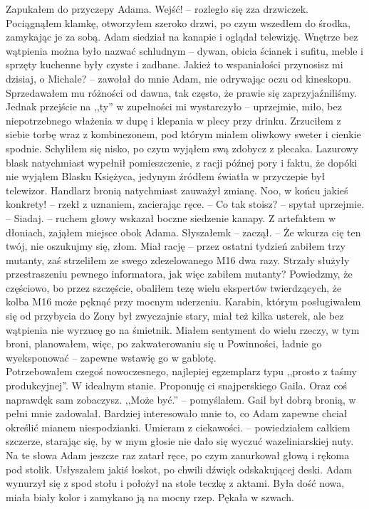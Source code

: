 \documentclass[../MAIN.tex]{subfiles}
\begin{document}
Zapukałem do przyczepy Adama.
\sx Wejść! -- rozległo się zza drzwiczek.
\qd
Pociągnąłem klamkę, otworzyłem szeroko drzwi, po czym wszedłem do środka, zamykając je za sobą. Adam siedział na kanapie i oglądał telewizję. Wnętrze bez wątpienia można było nazwać schludnym -- dywan, obicia ścianek i sufitu, meble i sprzęty kuchenne były czyste i zadbane.
\sx Jakież to wspaniałości przynosisz mi dzisiaj, o Michale? -- zawołał do mnie Adam, nie odrywając oczu od kineskopu. 
\qd
Sprzedawałem mu różności od dawna, tak często, że prawie się zaprzyjaźniliśmy. Jednak przejście na ,,ty'' w zupełności mi wystarczyło -- uprzejmie, miło, bez niepotrzebnego włażenia w dupę i klepania w plecy przy drinku. Zrzuciłem z siebie torbę wraz z kombinezonem, pod którym miałem oliwkowy sweter i cienkie spodnie. Schyliłem się nisko, po czym wyjąłem swą zdobycz z plecaka. Lazurowy blask natychmiast wypełnił pomieszczenie, z racji późnej pory i faktu, że dopóki nie wyjąłem Blasku Księżyca, jedynym źródłem światła w przyczepie był telewizor. Handlarz bronią natychmiast zauważył zmianę.
\sx Noo, w końcu jakieś konkrety! -- rzekł z uznaniem, zacierając ręce. -- Co tak stoisz? -- spytał uprzejmie. -- Siadaj. -- ruchem głowy wskazał boczne siedzenie kanapy.
\qd
Z artefaktem w dłoniach, zająłem miejsce obok Adama.
\sx Słyszałem\3k -- zaczął. -- Że wkurza cię ten twój, nie oszukujmy się, złom.
\qd
Miał rację -- przez ostatni tydzień zabiłem trzy mutanty, zaś strzeliłem ze swego zdezelowanego M16 dwa razy. Strzały służyły przestraszeniu pewnego informatora, jak więc zabiłem mutanty? Powiedzmy, że częściowo, bo przez szczęście, obaliłem tezę wielu ekspertów twierdzących, że kolba M16 może pęknąć przy mocnym uderzeniu. Karabin, którym posługiwałem się od przybycia do Zony był zwyczajnie stary, miał też kilka usterek, ale bez wątpienia nie wyrzucę go na śmietnik. Miałem sentyment do wielu rzeczy, w tym broni, planowałem, więc, po zakwaterowaniu się u Powinności, ładnie go wyeksponować -- zapewne wstawię go w gablotę.\\
Potrzebowałem czegoś nowoczesnego, najlepiej egzemplarz typu ,,prosto z taśmy produkcyjnej''. W idealnym stanie.
\sx Proponuję ci snajperskiego Gaila. Oraz coś naprawdę\3k sam zobaczysz.
,,Może być.'' -- pomyślałem. Gail był dobrą bronią, w pełni mnie zadowalał. 
\qd
Bardziej interesowało mnie to, co Adam zapewne chciał określić mianem niespodzianki.
\sx Umieram z ciekawości. -- powiedziałem całkiem szczerze, starając się, by w mym głosie nie dało się wyczuć wazeliniarskiej nuty. 
\qd
Na te słowa Adam jeszcze raz zatarł ręce, po czym zanurkował głową i rękoma pod stolik. Usłyszałem jakiś łoskot, po chwili dźwięk odskakującej deski. Adam wynurzył się z spod stołu i położył na stole teczkę z aktami. Była dość nowa, miała biały kolor i zamykano ją na mocny rzep. Pękała w szwach.
\end{document}
